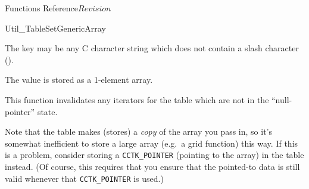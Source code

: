 \begin{cactuspart}{ Functions Reference}{}{$Revision$}
\begin{FunctionDescription}{Util\_TableSetGenericArray}
\begin{Discussion}
The key may be any C character string which does not contain a slash
character ().

The value is stored as a 1-element array.

This function invalidates any iterators for the table which are
not in the ``null-pointer'' state.

Note that the table makes (stores) a \emph{copy} of the array
you pass in, so it's somewhat inefficient to store a large array
(e.g.~a grid function) this way.  If this is a problem, consider
storing a \verb|CCTK_POINTER| (pointing to the array) in the table
instead.  (Of course, this requires that you ensure that the pointed-to
data is still valid whenever that \verb|CCTK_POINTER| is used.)
\end{Discussion}


\end{FunctionDescription}
\end{cactuspart}
